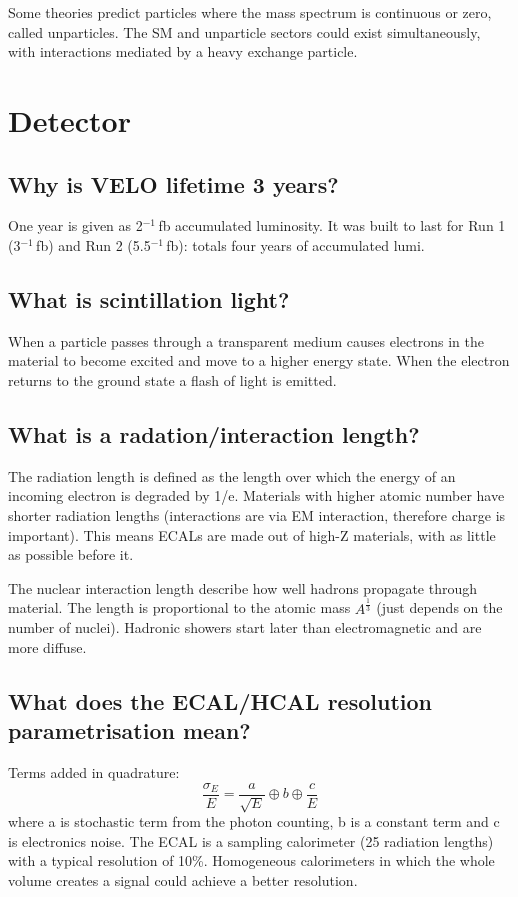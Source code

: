 \documentclass[12pt]{article}
\begin{document}
Some theories predict particles where the mass spectrum is continuous or zero, called unparticles. The SM and unparticle sectors could exist simultaneously, with interactions mediated by a heavy exchange particle.  


\section{Detector}
\subsection{Why is VELO lifetime 3 years?}
One year is given as 2$^{-1}\,$fb accumulated luminosity. It was built to last for Run 1 (3$^{-1}\,$fb) and Run 2 (5.5$^{-1}\,$fb): totals four years of accumulated lumi.

\subsection{What is scintillation light?}
When a particle passes through a transparent medium causes electrons in the material to become excited and move to a higher energy state. When the electron returns to the ground state a flash of light is emitted.

\subsection{What is a radation/interaction length?}
The radiation length is defined as the length over which the energy of an incoming electron is degraded by 1/e. Materials with higher atomic number have shorter radiation lengths (interactions are via EM interaction, therefore charge is important). This means ECALs are made out of high-Z materials, with as little as possible before it.

The nuclear interaction length describe how well hadrons propagate through material. The length is proportional to the atomic mass $A^{\frac{1}{3}}$ (just depends on the number of nuclei). Hadronic showers start later than electromagnetic and are more diffuse.

\subsection{What does the ECAL/HCAL resolution parametrisation mean?}
Terms added in quadrature:
\begin{equation}
\frac{\sigma_{E}}{E} = \frac{a}{\sqrt{E}} \oplus b \oplus \frac{c}{E} 
\end{equation}
where a is stochastic term from the photon counting, b is a constant term and c is electronics noise. The ECAL is a sampling calorimeter (25 radiation lengths) with a typical resolution of 10\%. Homogeneous calorimeters in which the whole volume creates a signal could achieve a better resolution. 
\end{document}
